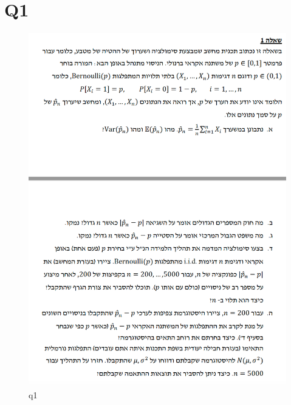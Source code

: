 \newpage

\section{Q1}


\begin{figure}[htbp]
    \centering
    \includegraphics[width=0.65\linewidth]{images/q1.png}
    \caption{q1}
    \label{fig:enter-label}
\end{figure}

